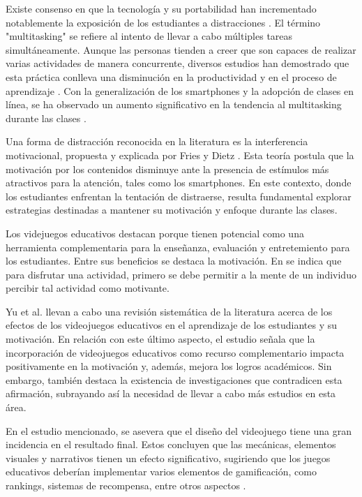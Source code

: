 Existe consenso en que la tecnología y su portabilidad han incrementado notablemente la exposición de los estudiantes a distracciones \cite{Zimmerman2011HandbookOS, Wang2022ComprehensivelySummarizeDistractions}. El término "multitasking" se refiere al intento de llevar a cabo múltiples tareas simultáneamente. Aunque las personas tienden a creer que son capaces de realizar varias actividades de manera concurrente, diversos estudios han demostrado que esta práctica conlleva una disminución en la productividad y en el proceso de aprendizaje \cite{Domoff2019AddictivePU}. Con la generalización de los smartphones y la adopción de clases en línea, se ha observado un aumento significativo en la tendencia al multitasking durante las clases \cite{Wang2022ComprehensivelySummarizeDistractions}.

Una forma de distracción reconocida en la literatura es la interferencia motivacional, propuesta y explicada por Fries y Dietz \cite{Fries2007LearningMotivationalInterference}. Esta teoría postula que la motivación por los contenidos disminuye ante la presencia de estímulos más atractivos para la atención, tales como los smartphones. En este contexto, donde los estudiantes enfrentan la tentación de distraerse, resulta fundamental explorar estrategias destinadas a mantener su motivación y enfoque durante las clases.

Los videjuegos educativos destacan porque tienen potencial como una herramienta complementaria para la enseñanza, evaluación y entretemiento para los estudiantes. Entre sus beneficios se destaca la motivación. En \cite{Bisson1996FunInLEarningPedagogicalRole} se indica que para disfrutar una actividad, primero se debe permitir a la mente de un individuo percibir tal actividad como motivante. 

Yu et al. \cite{Yu2020TheEffectsOfEducationGames} llevan a cabo una revisión sistemática de la literatura acerca de los efectos de los videojuegos educativos en el aprendizaje de los estudiantes y su motivación. En relación con este último aspecto, el estudio señala que la incorporación de videojuegos educativos como recurso complementario impacta positivamente en la motivación y, además, mejora los logros académicos. Sin embargo, también destaca la existencia de investigaciones que contradicen esta afirmación, subrayando así la necesidad de llevar a cabo más estudios en esta área.

En el estudio mencionado, se asevera que el diseño del videojuego tiene una gran incidencia en el resultado final. Estos concluyen que las mecánicas, elementos visuales y narrativos tienen un efecto significativo, sugiriendo que los juegos educativos deberían implementar varios elementos de gamificación, como rankings, sistemas de recompensa, entre otros aspectos \cite{Yu2020TheEffectsOfEducationGames}.

